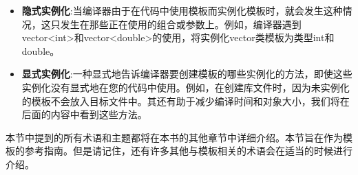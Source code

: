 \begin{itemize}
\item
\textbf{隐式实例化}:当编译器由于在代码中使用模板而实例化模板时，就会发生这种情况，这只发生在那些正在使用的组合或参数上。例如，编译器遇到vector<int>和vector<double>的使用，将实例化vector类模板为类型int和double。

\item
\textbf{显式实例化}:一种显式地告诉编译器要创建模板的哪些实例化的方法，即使这些实例化没有显式地在您的代码中使用。例如，在创建库文件时，因为未实例化的模板不会放入目标文件中。其还有助于减少编译时间和对象大小，我们将在后面的内容中看到这些方法。
\end{itemize}

本节中提到的所有术语和主题都将在本书的其他章节中详细介绍。本节旨在作为模板的参考指南。但是请记住，还有许多其他与模板相关的术语会在适当的时候进行介绍。



